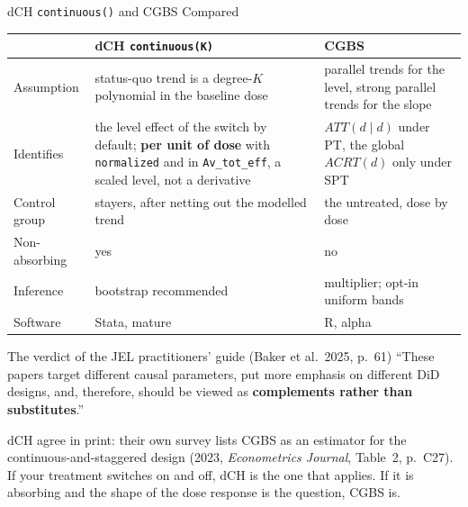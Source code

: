 \documentclass[main.tex]{subfiles}
\begin{document}
\begin{frame}{dCH \texttt{continuous()} and CGBS Compared}

  \begin{center}\footnotesize
  \begin{tabular}{@{}p{}p{}p{}@{}}
    \toprule
    & dCH \texttt{continuous(K)} & CGBS \\
    \midrule
    Assumption & status-quo trend is a degree-$K$ polynomial in the baseline dose
      & parallel trends for the level, strong parallel trends for the slope \\[2pt]
    Identifies & the level effect of the switch by default; \textbf{per unit
      of dose} with \texttt{normalized} and in \texttt{Av\_tot\_eff}, a
      scaled level, not a derivative
      & $ATT(d\mid d)$ under PT, the global $ACRT(d)$ only under SPT \\[2pt]
    Control group & stayers, after netting out the modelled trend
      & the untreated, dose by dose \\[2pt]
    Non-absorbing & yes & no \\[2pt]
    Inference & bootstrap recommended & multiplier; opt-in uniform bands \\[2pt]
    Software & Stata, mature & R, alpha \\
    \bottomrule
  \end{tabular}
  \end{center}

  \smallskip
  \begin{block}{\footnotesize The verdict of the JEL practitioners' guide (Baker et al.\ 2025, p.~61)}
    \footnotesize
    ``These papers target different causal parameters, put more emphasis on
    different DiD designs, and, therefore, should be viewed as \textbf{complements
    rather than substitutes}.''
  \end{block}

  \smallskip
  \footnotesize dCH agree in print: their own survey lists CGBS as an estimator
  for the continuous-and-staggered design (2023, \textit{Econometrics Journal},
  Table~2, p.~C27). If your treatment switches on and off, dCH is the one that
  applies. If it is absorbing and the shape of the dose response is the question,
  CGBS is.

\end{frame}
\end{document}
